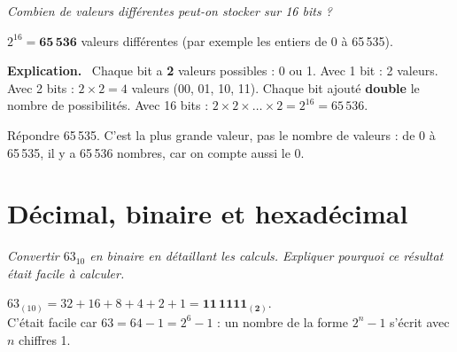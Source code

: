 \documentclass[addpoints, 11pt]{exam}
\newcommand{\enonce}[1]{\textit{#1}\par\smallskip}
\newcommand{\explication}{\par\smallskip\noindent\textbf{Explication.}\ }
\DeclareRobustCommand{\_}{\textunderscore\allowbreak}
\begin{document}
\begin{questions}
\question[1] \enonce{Combien de valeurs différentes peut-on stocker sur 16 bits ?}

\begin{reponse}
$2^{16} = \mathbf{65\,536}$ valeurs différentes (par exemple les entiers de 0 à 65\,535).
\end{reponse}

\explication
Chaque bit a \textbf{2} valeurs possibles : 0 ou 1. Avec 1 bit : 2 valeurs. Avec 2 bits : $2 \times 2 = 4$ valeurs (00, 01, 10, 11). Chaque bit ajouté \textbf{double} le nombre de possibilités. Avec 16 bits : $2 \times 2 \times \dots \times 2 = 2^{16} = 65\,536$.

\begin{erreur}
Répondre 65\,535. C'est la plus grande valeur, pas le nombre de valeurs : de 0 à 65\,535, il y a 65\,536 nombres, car on compte aussi le 0.
\end{erreur}

\section{Décimal, binaire et hexadécimal}

\question[1] \enonce{Convertir $63_{10}$ en binaire en détaillant les calculs. Expliquer pourquoi ce résultat était facile à calculer.}

\begin{reponse}
$63_{(10)} = 32 + 16 + 8 + 4 + 2 + 1 = \mathbf{11\,1111_{(2)}}$.\\
C'était facile car $63 = 64 - 1 = 2^6 - 1$ : un nombre de la forme $2^n - 1$ s'écrit avec $n$ chiffres 1.
\end{reponse}


\end{questions}
\end{document}
